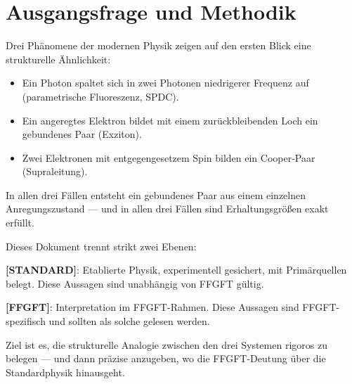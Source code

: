 %

\providecommand{\ket}[1]{\left|#1\right\rangle}
\providecommand{\bra}[1]{\left\langle#1\right|}

\section{Ausgangsfrage und Methodik}
\label{sec:ausgangsfrage}

Drei Phänomene der modernen Physik zeigen auf den ersten Blick
eine strukturelle Ähnlichkeit:

\begin{itemize}
  \item Ein Photon spaltet sich in zwei Photonen niedrigerer Frequenz auf
    (parametrische Fluoreszenz, SPDC).
  \item Ein angeregtes Elektron bildet mit einem zurückbleibenden
    Loch ein gebundenes Paar (Exziton).
  \item Zwei Elektronen mit entgegengesetzem Spin bilden
    ein Cooper-Paar (Supraleitung).
\end{itemize}

In allen drei Fällen entsteht ein gebundenes Paar aus einem
einzelnen Anregungszustand --- und in allen drei Fällen sind
Erhaltungsgrößen exakt erfüllt.

\begin{important}
Dieses Dokument trennt strikt zwei Ebenen:

\textbf{[STANDARD]}: Etablierte Physik, experimentell gesichert,
mit Primärquellen belegt.
Diese Aussagen sind unabhängig von FFGFT gültig.

\textbf{[FFGFT]}: Interpretation im FFGFT-Rahmen.
Diese Aussagen sind FFGFT-spezifisch und
sollten als solche gelesen werden.

Ziel ist es, die strukturelle Analogie zwischen den drei Systemen
rigoros zu belegen --- und dann präzise anzugeben,
wo die FFGFT-Deutung über die Standardphysik hinausgeht.
\end{important}

